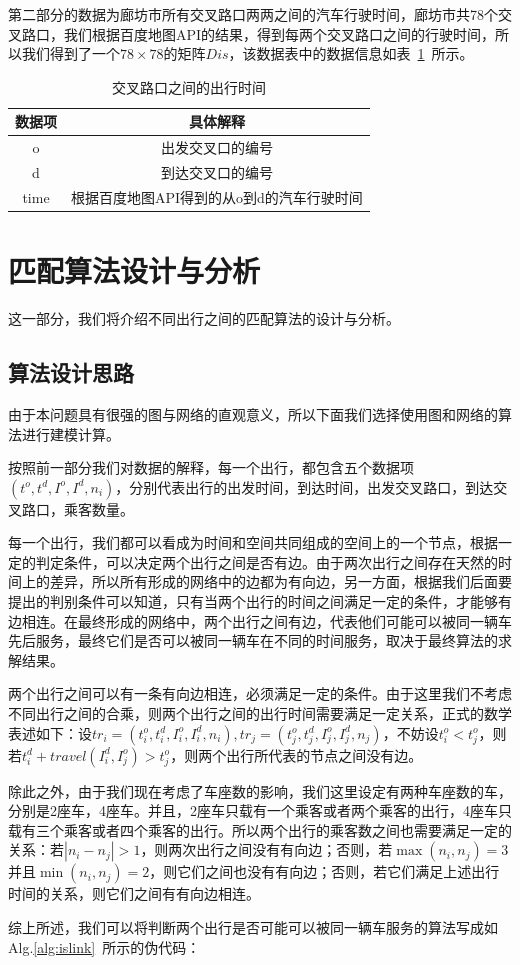 \par
第二部分的数据为廊坊市所有交叉路口两两之间的汽车行驶时间，廊坊市共78个交叉路口，我们根据百度地图API的结果，得到每两个交叉路口之间的行驶时间，所以我们得到了一个$78\times 78$的矩阵$Dis$，该数据表中的数据信息如表~\ref{tab:odtime}~所示。

\begin{table}
  \centering
  \caption{交叉路口之间的出行时间}
  \label{tab:odtime}
  \begin{tabular}{|c|c|}
  \hline 
  数据项 & 具体解释\\
  \hline \hline 
  o & 出发交叉口的编号\\
  \hline 
  d & 到达交叉口的编号\\
  \hline 
  time & 根据百度地图API得到的从o到d的汽车行驶时间\\
  \hline 
  \end{tabular}
\end{table}

\section{匹配算法设计与分析}
这一部分，我们将介绍不同出行之间的匹配算法的设计与分析。
\subsection{算法设计思路}
由于本问题具有很强的图与网络的直观意义，所以下面我们选择使用图和网络的算法进行建模计算。
\par
按照前一部分我们对数据的解释，每一个出行，都包含五个数据项$(t^o, t^d, I^o, I^d, n_i)$，分别代表出行的出发时间，到达时间，出发交叉路口，到达交叉路口，乘客数量。
\par
每一个出行，我们都可以看成为时间和空间共同组成的空间上的一个节点，根据一定的判定条件，可以决定两个出行之间是否有边。由于两次出行之间存在天然的时间上的差异，所以所有形成的网络中的边都为有向边，另一方面，根据我们后面要提出的判别条件可以知道，只有当两个出行的时间之间满足一定的条件，才能够有边相连。在最终形成的网络中，两个出行之间有边，代表他们可能可以被同一辆车先后服务，最终它们是否可以被同一辆车在不同的时间服务，取决于最终算法的求解结果。
\par
两个出行之间可以有一条有向边相连，必须满足一定的条件。由于这里我们不考虑不同出行之间的合乘，则两个出行之间的出行时间需要满足一定关系，正式的数学表述如下：设$tr_i = (t_i^o, t_i^d, I_i^o, I_i^d, n_i), tr_j = (t_j^o, t_j^d, I_j^o, I_j^d, n_j)$，不妨设$t_i^o < t_j^o$，则若$t_i^d + travel(I_i^d, I_j^o) > t_j^o$，则两个出行所代表的节点之间没有边。
\par
除此之外，由于我们现在考虑了车座数的影响，我们这里设定有两种车座数的车，分别是2座车，4座车。并且，2座车只载有一个乘客或者两个乘客的出行，4座车只载有三个乘客或者四个乘客的出行。所以两个出行的乘客数之间也需要满足一定的关系：若$|n_i - n_j| > 1$，则两次出行之间没有有向边；否则，若$\max(n_i, n_j) = 3$并且$\min (n_i, n_j) = 2$，则它们之间也没有有向边；否则，若它们满足上述出行时间的关系，则它们之间有有向边相连。
\par
综上所述，我们可以将判断两个出行是否可能可以被同一辆车服务的算法写成如Alg.\ref{alg:islink}~所示的伪代码：

